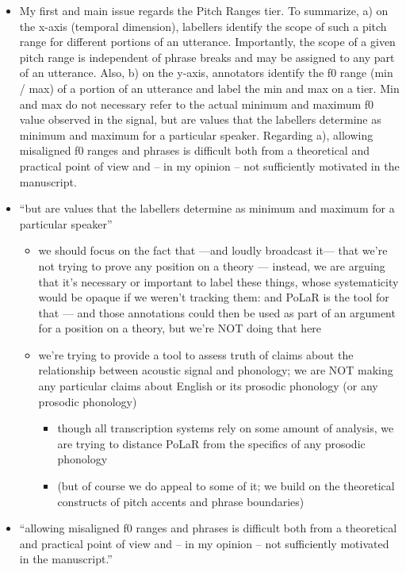 \documentclass[11pt, twoside]{memoir}
\begin{document}
\begin{itemize}
\tightlist
\item
  My first and main issue regards the Pitch Ranges tier. To summarize,
  a) on the x-axis (temporal dimension), labellers identify the scope of
  such a pitch range for different portions of an utterance.
  Importantly, the scope of a given pitch range is independent of phrase
  breaks and may be assigned to any part of an utterance. Also, b) on
  the y-axis, annotators identify the f0 range (min / max) of a portion
  of an utterance and label the min and max on a tier. Min and max do
  not necessary refer to the actual minimum and maximum f0 value
  observed in the signal, but are values that the labellers determine as
  minimum and maximum for a particular speaker. Regarding a), allowing
  misaligned f0 ranges and phrases is difficult both from a theoretical
  and practical point of view and -- in my opinion -- not sufficiently
  motivated in the manuscript.\\
\item
  ``but are values that the labellers determine as minimum and maximum
  for a particular speaker''

  \begin{itemize}
  \tightlist
  \item
    we should focus on the fact that ---and loudly broadcast it--- that
    we're not trying to prove any position on a theory --- instead, we
    are arguing that it's necessary or important to label these things,
    whose systematicity would be opaque if we weren't tracking them: and
    PoLaR is the tool for that --- and those annotations could then be
    used as part of an argument for a position on a theory, but we're
    NOT doing that here\\
  \item
    we're trying to provide a tool to assess truth of claims about the
    relationship between acoustic signal and phonology; we are NOT
    making any particular claims about English or its prosodic phonology
    (or any prosodic phonology)

    \begin{itemize}
    \tightlist
    \item
      though all transcription systems rely on some amount of analysis,
      we are trying to distance PoLaR from the specifics of any prosodic
      phonology\\
    \item
      (but of course we do appeal to some of it; we build on the
      theoretical constructs of pitch accents and phrase boundaries)\\
    \end{itemize}
  \end{itemize}
\item
  ``allowing misaligned f0 ranges and phrases is difficult both from a
  theoretical and practical point of view and -- in my opinion -- not
  sufficiently motivated in the manuscript.''


\end{itemize}
\end{document}
